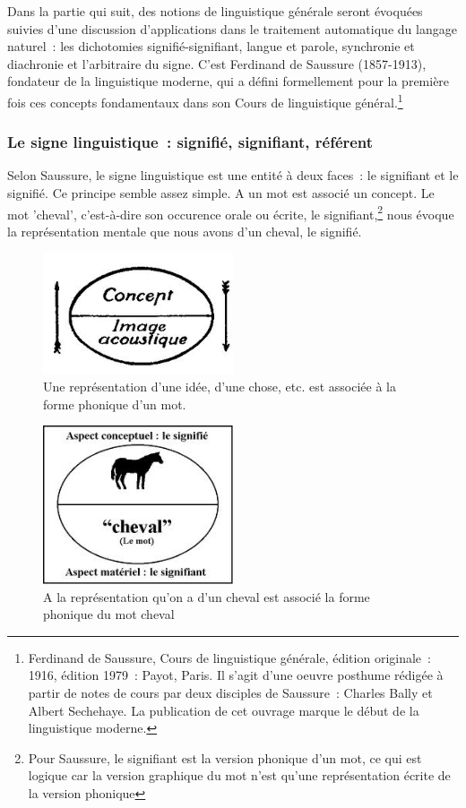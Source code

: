 \documentclass[a4paper,11pt,french]{article}
\begin{document}
Dans la partie qui suit, des notions de linguistique générale seront évoquées suivies d'une discussion d'applications dans le traitement automatique du langage naturel~: les dichotomies signifié-signifiant, langue et parole, synchronie et diachronie et l'arbitraire du signe. C'est Ferdinand de Saussure (1857-1913), fondateur de la linguistique moderne, qui a défini formellement pour la première fois ces concepts fondamentaux dans son Cours de linguistique général.\footnote{Ferdinand de Saussure, Cours de linguistique générale, édition originale~: 1916, édition 1979~: Payot, Paris. Il s'agit d'une oeuvre posthume rédigée à partir de notes de cours par deux disciples de Saussure~: Charles Bally et Albert Sechehaye. La publication de cet ouvrage marque le début de la linguistique moderne.}

\subsubsection{Le signe linguistique~: signifié, signifiant, référent}

Selon Saussure, le signe linguistique est une entité à deux faces~: le signifiant et le signifié. Ce principe semble assez simple. A un mot est associé un concept. Le mot 'cheval', c'est-à-dire son occurence orale ou écrite, le signifiant,\footnote{Pour Saussure, le signifiant est la version phonique d'un mot, ce qui est logique car la version graphique du mot n'est qu'une représentation écrite de la version phonique} nous évoque la représentation mentale que nous avons d'un cheval, le signifié. 


\begin{figure}[h!]
  \centering
      \includegraphics[width=0.5\textwidth]{img/signe-conceptimageacoustique.jpeg}
  \caption{Une représentation d'une idée, d'une chose, etc. est associée à la forme phonique d'un mot.}
\end{figure}

\begin{figure}[h!]
  \centering
      \includegraphics[width=0.5\textwidth]{img/signe-cheval.jpeg}
  \caption{A la représentation qu'on a d'un cheval est associé la forme phonique du mot cheval}
\end{figure}
\end{document}

